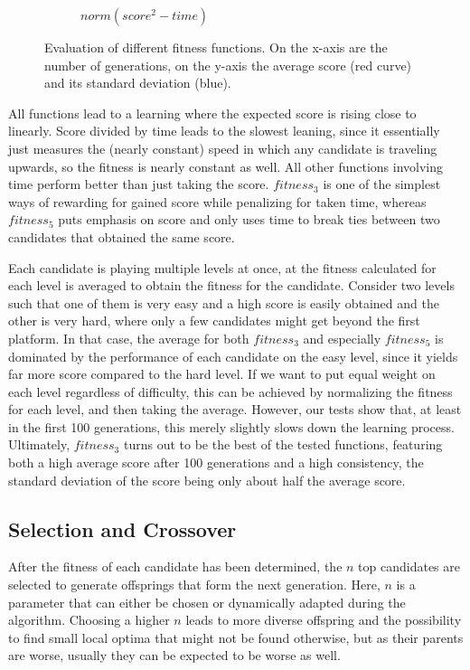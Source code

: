 \documentclass[a4paper,12pt,pagesize,headsepline,bibtotoc,titlepage,abstracton]{scrartcl}
\begin{document}
\begin{figure}[hbp]
\begin{center}
\begin{subfigure}[b]{0.45\textwidth}
    \caption{$norm(score^2 - time)$}
\end{subfigure}
\caption{Evaluation of different fitness functions. On the x-axis are the number of generations, on the y-axis the average score (red curve) and its standard deviation (blue).}
\label{fig:fitness}
\end{center}
\end{figure}

All functions lead to a learning where the expected score is rising close to linearly. Score divided by time leads to the slowest leaning, since it essentially just measures the (nearly constant) speed in which any candidate is traveling upwards, so the fitness is nearly constant as well. All other functions involving time perform better than just taking the score. $fitness_3$ is one of the simplest ways of rewarding for gained score while penalizing for taken time, whereas $fitness_5$ puts emphasis on score and only uses time to break ties between two candidates that obtained the same score. 

Each candidate is playing multiple levels at once, at the fitness calculated for each level is averaged to obtain the fitness for the candidate. Consider two levels such that one of them is very easy and a high score is easily obtained and the other is very hard, where only a few candidates might get beyond the first platform. In that case, the average for both $fitness_3$ and especially $fitness_5$ is dominated by the performance of each candidate on the easy level, since it yields far more score compared to the hard level. If we want to put equal weight on each level regardless of difficulty, this can be achieved by normalizing the fitness for each level, and then taking the average. However, our tests show that, at least in the first 100 generations, this merely slightly slows down the learning process. Ultimately, $fitness_3$ turns out to be the best of the tested functions, featuring both a high average score after 100 generations and a high consistency, the standard deviation of the score being only about half the average score.

\subsection{Selection and Crossover}

After the fitness of each candidate has been determined, the $n$ top candidates are selected to generate offsprings that form the next generation. Here, $n$ is a parameter that can either be chosen or dynamically adapted during the algorithm. Choosing a higher $n$ leads to more diverse offspring and the possibility to find small local optima that might not be found otherwise, but as their parents are worse, usually they can be expected to be worse as well.
\end{document}
